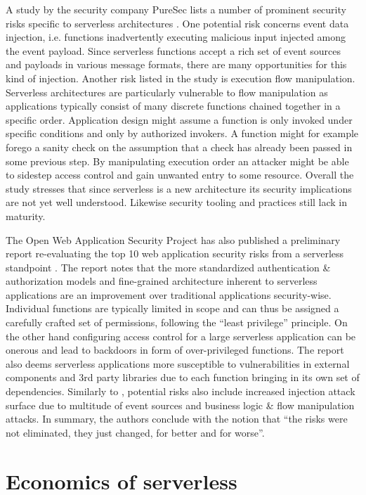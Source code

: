 A study by the security company PureSec lists a number of prominent security risks specific to serverless architectures \parencite{segal18risks}. One potential risk concerns event data injection, i.e. functions inadvertently executing malicious input injected among the event payload. Since serverless functions accept a rich set of event sources and payloads in various message formats, there are many opportunities for this kind of injection. Another risk listed in the study is execution flow manipulation. Serverless architectures are particularly vulnerable to flow manipulation as applications typically consist of many discrete functions chained together in a specific order. Application design might assume a function is only invoked under specific conditions and only by authorized invokers. A function might for example forego a sanity check on the assumption that a check has already been passed in some previous step. By manipulating execution order an attacker might be able to sidestep access control and gain unwanted entry to some resource. Overall the study stresses that since serverless is a new architecture its security implications are not yet well understood. Likewise security tooling and practices still lack in maturity.

The Open Web Application Security Project has also published a preliminary report re-evaluating the top 10 web application security risks from a serverless standpoint \parencite{owasp18top10}. The report notes that the more standardized authentication \& authorization models and fine-grained architecture inherent to serverless applications are an improvement over traditional applications security-wise. Individual functions are typically limited in scope and can thus be assigned a carefully crafted set of permissions, following the ``least privilege'' principle. On the other hand configuring access control for a large serverless application can be onerous and lead to backdoors in form of over-privileged functions. The report also deems serverless applications more susceptible to vulnerabilities in external components and 3rd party libraries due to each function bringing in its own set of dependencies. Similarly to \textcite{segal18risks}, potential risks also include increased injection attack surface due to multitude of event sources and business logic \& flow manipulation attacks. In summary, the authors conclude with the notion that ``the risks were not eliminated, they just changed, for better and for worse''.

\section{Economics of serverless} \label{sec:economics}

